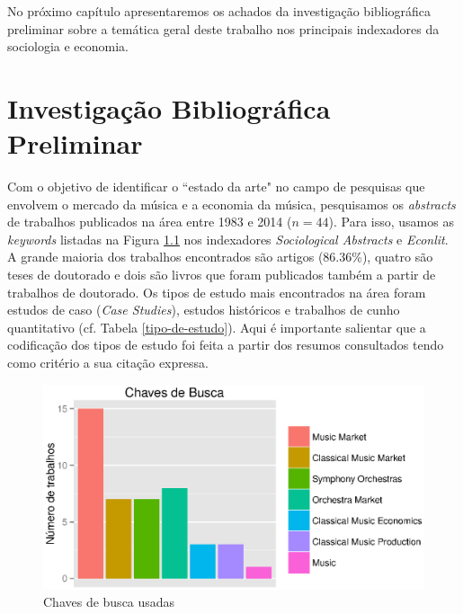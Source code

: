 \documentclass[a4paper, 12pt, openright, oneside, german, french, english, brazil]{abntex2}
\begin{document}
	No próximo capítulo apresentaremos os achados da investigação bibliográfica preliminar sobre a temática geral deste trabalho nos principais indexadores da sociologia e economia.
	
	
	
	
	
	
	
	

	\chapter{Investigação Bibliográfica Preliminar}

	Com o objetivo de identificar o ``estado da arte"  no campo de pesquisas que envolvem o mercado da música e a economia da música, pesquisamos os \textit{abstracts} de trabalhos publicados na área entre 1983 e 2014 ($n=44$). Para isso, usamos as \textit{keywords} listadas na Figura \ref{chaves-busca} nos indexadores \textit{Sociological Abstracts} e \textit{Econlit}. A grande maioria dos trabalhos encontrados são artigos (86.36\%), quatro são teses de doutorado e dois são livros que foram publicados também a partir de trabalhos de doutorado. Os tipos de estudo mais encontrados na área foram estudos de caso (\textit{Case Studies}), estudos históricos e trabalhos de cunho quantitativo (cf. Tabela \ref{tipo-de-estudo}). Aqui é importante salientar que a codificação dos tipos de estudo foi feita a partir dos resumos consultados tendo como critério a sua citação expressa.

	\begin{figure}[!h]
		\centering
		\caption{Chaves de busca usadas}
		\label{chaves-busca}
		\includegraphics[scale=0.8]{chave.eps}
	\end{figure}
\end{document}
